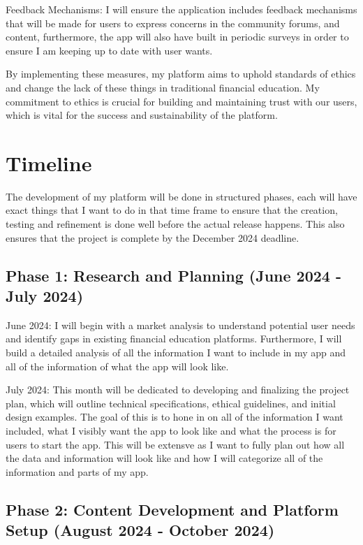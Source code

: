 \documentclass[12pt,twocolumn]{article}
\begin{document}
Feedback Mechanisms: I will ensure the application includes feedback mechanisms that will be made for users to express concerns in the community forums, and content, furthermore, the app will also have built in periodic surveys in order to ensure I am keeping up to date with user wants. 

By implementing these measures, my platform aims to uphold standards of ethics and change the lack of these things in traditional financial education. My commitment to ethics is crucial for building and maintaining trust with our users, which is vital for the success and sustainability of the platform.

\section{Timeline}

The development of my platform will be done in structured phases, each will have exact things that I want to do in that time frame to ensure that the creation, testing and refinement is done well before the actual release happens. This also ensures that the project is complete by the December 2024 deadline.

\subsection{Phase 1: Research and Planning (June 2024 - July 2024)}

June 2024: I will begin with a market analysis to understand potential user needs and identify gaps in existing financial education platforms. Furthermore, I will build a detailed analysis of all the information I want to include in my app and all of the information of what the app will look like.

July 2024: This month will be dedicated to developing and finalizing the project plan, which will outline technical specifications, ethical guidelines, and initial design examples. The goal of this is to hone in on all of the information I want included, what I visibly want the app to look like and what the process is for users to start the app. This will be extensve as I want to fully plan out how all the data and information will look like and how I will categorize all of the information and parts of my app. 

\subsection{Phase 2: Content Development and Platform Setup (August 2024 - October 2024)}
\end{document}

